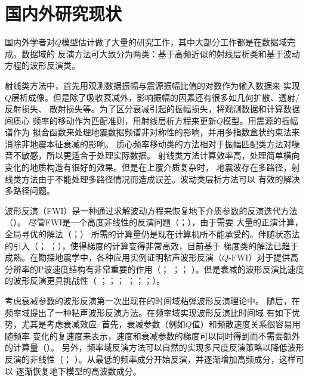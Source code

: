 \vspace{0.5cm}
\section{国内外研究现状}

国内外学者对$Q$模型估计做了大量的研究工作，其中大部分工作都是在数据域完成。数据域的
反演方法可大致分为两类：基于高频近似的射线层析类和基于波动方程的波形反演类。

射线类方法中，首先用观测数据振幅与震源振幅比值的对数作为输入数据来
实现$Q$层析成像。但是除了吸收衰减外，影响振幅的因素还有很多如几何扩散、透射/反射损失、
散射损失等。为了区分衰减引起的振幅损失，将观测数据和计算数据间质心
频率的移动作为匹配准则，用射线层析方程来更新$Q$模型。用震源的振幅谱作为
拟合函数来处理地震数据频谱非对称性的影响，并用多指数盒状约束法来消除非地震本征衰减的影响。
质心频率移动类的方法相对于振幅匹配类方法对噪音不敏感，所以更适合于处理实际数据。
射线类方法计算效率高，处理简单横向变化的地质构造有很好的效果。但是在上覆介质复杂时，
地震波存在多路径，射线类方法由于不能处理多路径情况而造成误差。波动类层析方法可以
有效的解决多路径问题。

波形反演（FWI）是一种通过求解波动方程来恢复地下介质参数的反演迭代方法（）。
尽管FWI是一个高度非线性的反演问题（；），由于需要
大量的正演计算，全局寻优的解法（；）
所需的计算量仍是现在计算机所不能承受的。伴随状态法的引入（；
；），使得梯度的计算变得非常高效，目前基于
梯度类的解法已趋于成熟。在勘探地震学中，各种应用实例证明粘声波形反演（$Q$-FWI）对于提供高
分辨率的P波速度结构有非常重要的作用（； 
；； ）。但是衰减的波形反演比速度的波形反演更具挑战性（
；；； 
；；；）。

考虑衰减参数的波形反演第一次出现在的时间域粘弹波形反演理论中。
随后，在频率域提出了一种粘声波形反演方法。在频率域实现波形反演比时间域
有如下优势，尤其是考虑衰减效应: 首先，衰减参数（例如$Q$值）和频散速度关系很容易用随频率
变化的复速度来表示，速度和衰减参数的梯度可以同时得到而不需要额外的计算量（）。
另外，频率域反演方法可以自然的实现多尺度反演策略以降低波形反演的非线性（；
）。从最低的频率成分开始反演，并逐渐增加高频成分，这样可以
逐渐恢复地下模型的高波数成分。

